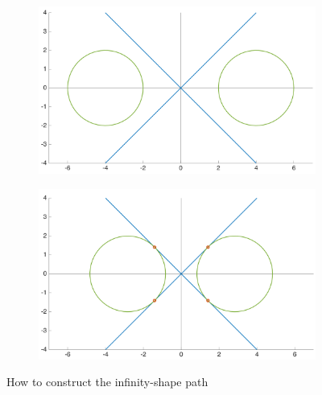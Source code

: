 \begin{figure}[!htbp]
 \centering
   \begin{subfigure}[b]{0.45\textwidth}
     \includegraphics[width=\textwidth]{img/constructionshape1_.png}
        \label{fig:constuctinfinity1}
   \end{subfigure}
   \hfill
   \begin{subfigure}[b]{0.45\textwidth}
     \includegraphics[width=\textwidth]{img/constructionshape2_.png}
       \label{fig:constuctinfinity2}
   \end{subfigure}
   \caption{How to construct the infinity-shape path}
 \end{figure} 
  


